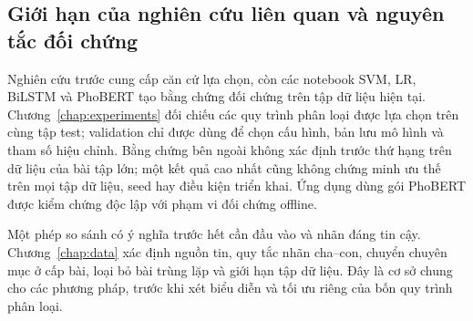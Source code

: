 \subsection{Giới hạn của nghiên cứu liên quan và nguyên tắc đối chứng}
Nghiên cứu trước cung cấp căn cứ lựa chọn, còn các notebook SVM, LR, BiLSTM và PhoBERT tạo bằng chứng đối chứng trên tập dữ liệu hiện tại. Chương~\ref{chap:experiments} đối chiếu các quy trình phân loại được lựa chọn trên cùng tập test; validation chỉ được dùng để chọn cấu hình, bản lưu mô hình và tham số hiệu chỉnh. Bằng chứng bên ngoài không xác định trước thứ hạng trên dữ liệu của bài tập lớn; một kết quả cao nhất cũng không chứng minh ưu thế trên mọi tập dữ liệu, seed hay điều kiện triển khai. Ứng dụng dùng gói PhoBERT được kiểm chứng độc lập với phạm vi đối chứng offline.

Một phép so sánh có ý nghĩa trước hết cần đầu vào và nhãn đáng tin cậy. Chương~\ref{chap:data} xác định nguồn tin, quy tắc nhãn cha--con, chuyển chuyên mục ở cấp bài, loại bỏ bài trùng lặp và giới hạn tập dữ liệu. Đây là cơ sở chung cho các phương pháp, trước khi xét biểu diễn và tối ưu riêng của bốn quy trình phân loại.

